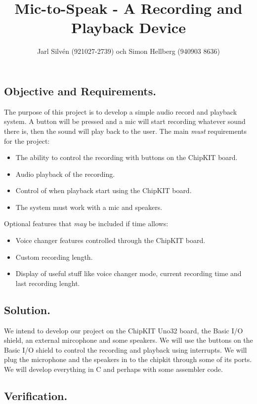 \documentclass[a4paper,11pt,twoside]{article}
\title{Mic-to-Speak - A Recording and Playback Device}
\author{Jarl Silvén (921027-2739) och Simon Hellberg (940903 8636)}
\date{\thedate}
\begin{document}
\maketitle

\newpage

\subsection*{Objective and Requirements.}

The purpose of this project is to develop a simple audio record and playback system. A button will be pressed and a mic will start recording whatever sound there is, then the sound will play back to the user. 
The main \emph{must} requirements for the project:
\begin{itemize}
\item The ability to control the recording with buttons on the ChipKIT board.
\item Audio playback of the recording.
\item Control of when playback start using the ChipKIT board.
\item The system must work with a mic and speakers.
\end{itemize}
Optional features that \emph{may} be included if time allows:
\begin{itemize}
\item Voice changer features controlled through the ChipKIT board.
\item Custom recording length.
\item Display of useful stuff like voice changer mode, current recording time and last recording lenght.
\end{itemize}

\subsection*{Solution.}

We intend to develop our project on the ChipKIT Uno32 board, the Basic I/O shield, an external mircophone and some speakers. We will use the buttons on the Basic I/O shield to control the recording and playback using interrupts. We will plug the microphone and the speakers in to the chipkit through some of its ports. We will develop everything in C and perhaps with some assembler code.

\subsection*{Verification.}
\end{document}
